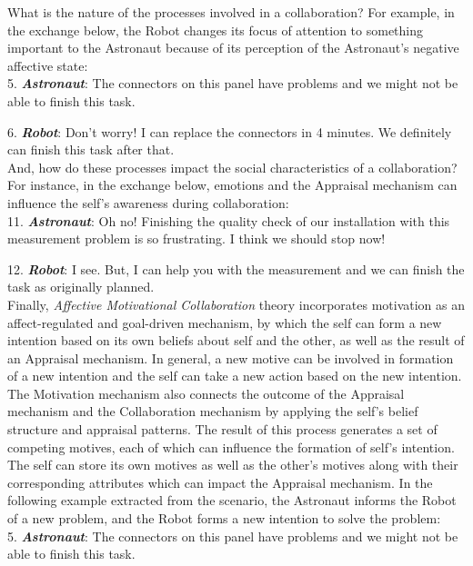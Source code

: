 \documentclass[12pt]{report}
\begin{document}
What is the nature of the processes involved in a collaboration? For example, in
the exchange below, the Robot changes its focus of attention to something
important to the Astronaut because of its perception of the Astronaut's negative
affective state:\\

  5. \textbf{\textit{Astronaut}}: The connectors on this panel have problems and
  we might not be able to finish this task.

  6. \textbf{\textit{Robot}}: Don't worry! I can replace the connectors in 4
  minutes. We definitely can finish this task after that.\\

And, how do these processes impact the social characteristics of a
collaboration? For instance, in the exchange below, emotions and the Appraisal
mechanism can influence the self's awareness during collaboration:\\

  11. \textbf{\textit{Astronaut}}: Oh no! Finishing the quality check of our
  installation with this measurement problem is so frustrating. I think we
  should stop now!

  12. \textbf{\textit{Robot}}: I see. But, I can help you with the measurement
  and we can finish the task as originally planned.\\

Finally, \textit{Affective Motivational Collaboration} theory incorporates
motivation as an affect-regulated and goal-driven mechanism, by which the self
can form a new intention based on its own beliefs about self and the other, as
well as the result of an Appraisal mechanism. In general, a new motive can
be involved in formation of a new intention and the self can take a new action
based on the new intention. The Motivation mechanism also connects the outcome
of the Appraisal mechanism and the Collaboration mechanism by applying the
self's belief structure and appraisal patterns. The result of this process
generates a set of competing motives, each of which can influence the
formation of self's intention. The self can store its own motives as well as the
other's motives along with their corresponding attributes which can impact the
Appraisal mechanism. In the following example extracted from the scenario, the
Astronaut informs the Robot of a new problem, and the Robot forms a new
intention to solve the problem:\\

  5. \textbf{\textit{Astronaut}}: The connectors on this panel have problems and
  we might not be able to finish this task.
\end{document}
